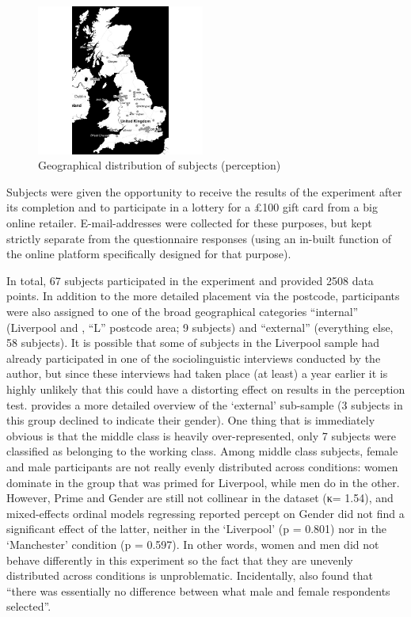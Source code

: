 \begin{figure}
	
	\includegraphics[width=0.49\textwidth]{./figures/participant_map}
	\caption{Geographical distribution of subjects (perception)}
	\label{fig.per.subjects}
\end{figure}

Subjects were given the opportunity to receive the results of the experiment after its completion and to participate in a lottery for a £100 gift card from a big online retailer.
E-mail-addresses were collected for these purposes, but kept strictly separate from the questionnaire responses (using an in-built function of the online platform specifically designed for that purpose).

\newpage 
In total, 67 subjects participated in the experiment and provided 2508 data points.
In addition to the more detailed placement via the postcode, participants were also assigned to one of the broad geographical categories ``internal'' (Liverpool and , ``L'' postcode area; 9 subjects) and ``external'' (everything else, 58 subjects).
It is possible that some of subjects in the Liverpool sample had already participated in one of the sociolinguistic interviews conducted by the author, but since these interviews had taken place (at least) a year earlier it is highly unlikely that this could have a distorting effect on results in the perception test.
 provides a more detailed overview of the `external' sub-sample (3 subjects in this group declined to indicate their gender).
One thing that is immediately obvious is that the middle class is heavily over-represented, only 7 subjects were classified as belonging to the working class.
Among middle class subjects, female and male participants are not really evenly distributed across  conditions: women dominate in the group that was primed for Liverpool, while men do in the other.
However, Prime and Gender are still not collinear in the dataset (κ= 1.54), and mixed-effects ordinal models regressing reported percept on Gender did not find a significant effect of the latter, neither in the `Liverpool' (p = 0.801) nor in the `Manchester' condition (p = 0.597).
In other words, women and men did not behave differently in this experiment so the fact that they are unevenly distributed across conditions is unproblematic.
Incidentally, \textcite[69 and 79--80]{niedzielski1999} also found that \enquote{there was essentially no difference between what male and female respondents selected}.


